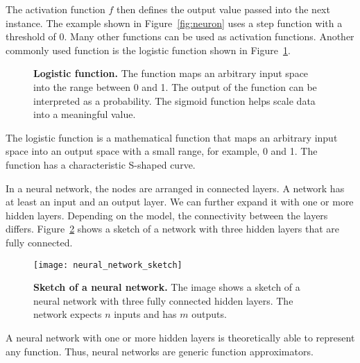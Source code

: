 The activation function $f$ then defines the output value passed into the next instance. The example shown in Figure~\ref{fig:neuron} uses a step function with a threshold of 0. Many other functions can be used as activation functions. Another commonly used function is the logistic function shown in Figure~\ref{fig:sigmoid}.
\begin{figure}[ht]
\centering
{}
\caption[Logistic function]{
 \textbf{Logistic function.}
 The function maps an arbitrary input space into the range between 0 and 1. The output of the function can be interpreted as a probability. The sigmoid function helps scale data into a meaningful value.
}
\label{fig:sigmoid}
\end{figure}
The logistic function is a mathematical function that maps an arbitrary input space into an output space with a small range, for example, 0 and 1. The function has a characteristic S-shaped curve.

In a neural network, the nodes are arranged in connected layers. A network has at least an input and an output layer. We can further expand it with one or more hidden layers. Depending on the model, the connectivity between the layers differs. Figure~\ref{fig:neural_network_sketch} shows a sketch of a network with three hidden layers that are fully connected.
\begin{figure}[ht]
\centering
\texttt{[image: neural\_network\_sketch]}
\caption[Sketch of a neural network]{
  \textbf{Sketch of a neural network.}
  The image shows a sketch of a neural network with three fully connected hidden layers. The network expects $n$ inputs and has $m$ outputs.
}
\label{fig:neural_network_sketch}
\end{figure}
A neural network with one or more hidden layers is theoretically able to represent any function. Thus, neural networks are generic function approximators.

